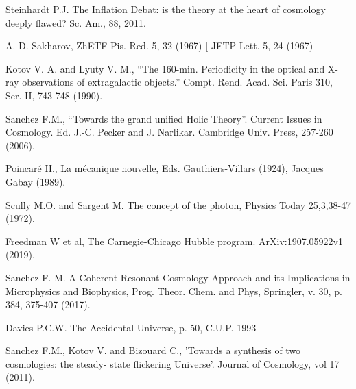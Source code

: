 \documentclass[a4paper,9pt]{article}
\begin{document}
\begin{thebibliography}{99}
 Steinhardt P.J. The Inflation Debat: is the theory at the heart of cosmology deeply flawed? Sc. Am., 88, 2011.

A. D. Sakharov, ZhETF Pis. Red. 5, 32 (1967) [ JETP Lett. 5, 24 (1967)

 Kotov V. A. and Lyuty V. M., “The 160-min. Periodicity in the optical and X-ray observations of extragalactic objects.” Compt. Rend. Acad. Sci. Paris 310, Ser. II, 743-748 (1990).

 Sanchez F.M., “Towards the grand unified Holic Theory”. Current Issues in Cosmology. Ed. J.-C. Pecker and J. Narlikar. Cambridge Univ. Press, 257-260 (2006).


 Poincaré H., La mécanique nouvelle, Eds. Gauthiers-Villars (1924), Jacques Gabay (1989).


 Scully M.O. and Sargent M. The concept of the photon, Physics Today 25,3,38-47 (1972).


 Freedman W et al, The Carnegie-Chicago Hubble program. ArXiv:1907.05922v1 (2019).




 Sanchez F. M. A Coherent Resonant Cosmology Approach and its Implications in Microphysics and Biophysics, Prog. Theor. Chem. and Phys, Springler, v. 30, p. 384, 375-407 (2017).

 Davies P.C.W. The Accidental Universe, p. 50, C.U.P. 1993










 Sanchez F.M., Kotov V. and Bizouard C., 'Towards a synthesis of two cosmologies: the steady- state flickering Universe'. Journal of Cosmology, vol 17 (2011).


\end{thebibliography}
\end{document}

